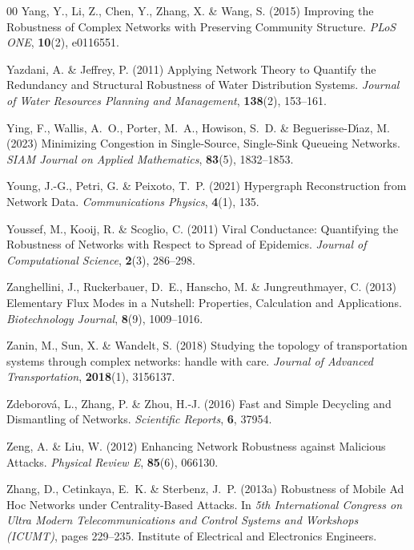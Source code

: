 \documentclass{comnet-mod}
\begin{document}
\begin{thebibliography}{00}
Yang, Y., Li, Z., Chen, Y., Zhang, X. {\&} Wang, S. (2015)  {Improving the
  Robustness of Complex Networks with Preserving Community Structure}. {\em
  {PLoS ONE}}, \textbf{10}(2), e0116551.

Yazdani, A. {\&} Jeffrey, P. (2011)  {Applying Network Theory to Quantify the
  Redundancy and Structural Robustness of Water Distribution Systems}. {\em
  {Journal of Water Resources Planning and Management}}, \textbf{138}(2),
  153--161.

Ying, F., Wallis, A.~O., Porter, M.~A., Howison, S.~D. {\&}
  Beguerisse-D{\'\i}az, M. (2023)  Minimizing Congestion in Single-Source,
  Single-Sink Queueing Networks. {\em {SIAM Journal on Applied Mathematics}},
  \textbf{83}(5), 1832--1853.

Young, J.-G., Petri, G. {\&} Peixoto, T.~P. (2021)  {Hypergraph Reconstruction
  from Network Data}. {\em {Communications Physics}}, \textbf{4}(1), 135.

Youssef, M., Kooij, R. {\&} Scoglio, C. (2011)  {Viral Conductance:
  {{Quantifying}} the Robustness of Networks with Respect to Spread of
  Epidemics}. {\em {Journal of Computational Science}}, \textbf{2}(3),
  286--298.

Zanghellini, J., Ruckerbauer, D.~E., Hanscho, M. {\&} Jungreuthmayer, C. (2013)
   {Elementary Flux Modes in a Nutshell: {{Properties}}, Calculation and
  Applications}. {\em {Biotechnology Journal}}, \textbf{8}(9), 1009--1016.

Zanin, M., Sun, X. {\&} Wandelt, S. (2018)  Studying the topology of
  transportation systems through complex networks: handle with care. {\em
  {Journal of Advanced Transportation}}, \textbf{2018}(1), 3156137.

Zdeborov{\'a}, L., Zhang, P. {\&} Zhou, H.-J. (2016)  {Fast and Simple
  Decycling and Dismantling of Networks}. {\em {Scientific Reports}},
  \textbf{6}, 37954.

Zeng, A. {\&} Liu, W. (2012)  {Enhancing Network Robustness against Malicious
  Attacks}. {\em {Physical Review E}}, \textbf{85}(6), 066130.

Zhang, D., Cetinkaya, E.~K. {\&} Sterbenz, J.~P. (2013a)  {Robustness of Mobile
  Ad Hoc Networks under Centrality-Based Attacks}. In {\em {5th International
  Congress on Ultra Modern Telecommunications and Control Systems and Workshops
  ({{ICUMT}})}}, pages 229--235. {Institute of Electrical and Electronics
  Engineers}.


\end{thebibliography}
\end{document}
